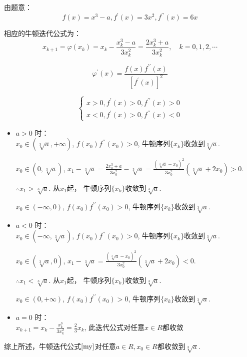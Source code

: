 \documentclass[a4paper]{article}
\begin{document}
由题意：
\begin{equation}
    f(x)=x^{3}-a, f^{\prime}(x)=3 x^{2}, f^{\prime \prime}(x)=6 x \nonumber
\end{equation} \par
相应的牛顿迭代公式为：
\begin{equation}
    x_{k+1}= \varphi(x_k) = x_{k}-\frac{x_{k}^{3}-a}{3 x_{k}^{2}}=\frac{2 x_{k}^{3}+a}{3 x_{k}^{2}}, \quad k=0,1,2, \cdots \label{my}
\end{equation} \par
\begin{equation}
    \varphi^{\prime}(x)=\frac{f(x) f^{\prime \prime}(x)}{\left[f^{\prime}(x)\right]^{2}} \nonumber
\end{equation} \par
\begin{equation}
    \begin{cases}
        x > 0, f^{\prime}(x) > 0, f^{\prime\prime}(x) > 0 \\
        x < 0, f^{\prime}(x) > 0, f^{\prime\prime}(x) < 0 
        \nonumber
    \end{cases}
\end{equation} \par
\begin{itemize}
    \item $a > 0$ 时： \\
    $x_{0}\in (\sqrt[3]{a}, +\infty)$, $f\left(x_{0}\right) f^{\prime \prime}\left(x_{0}\right)>0$, 牛顿序列$\{x_k\}$收敛到$\sqrt[3]{a}$. \par
    $x_{0}\in (0, \sqrt[3]{a})$, $x_{1}-\sqrt[3]{a}=\frac{2 x_{0}^{3}+a}{3 x_{0}^{2}}-\sqrt[3]{a}=\frac{\left(\sqrt[3]{a}-x_{0}\right)^{2}}{3 x_{0}^{2}}\left(\sqrt[3]{a}+2 x_{0}\right)>0$. \par
    $\therefore x_1 > \sqrt[3]{a}$. 从$x_1$起， 牛顿序列$\{x_k\}$收敛到$\sqrt[3]{a}$. \par
    $x_{0}\in (-\infty, 0)$, $f\left(x_{0}\right) f^{\prime \prime}\left(x_{0}\right)>0$, 牛顿序列$\{x_k\}$收敛到$\sqrt[3]{a}$. \par
    \item $a < 0$ 时： \\
    $x_{0}\in (-\infty, \sqrt[3]{a})$, $f\left(x_{0}\right) f^{\prime \prime}\left(x_{0}\right)>0$, 牛顿序列$\{x_k\}$收敛到$\sqrt[3]{a}$. \par
    $x_{0}\in (\sqrt[3]{a}, 0)$, $x_{1}-\sqrt[3]{a}=\frac{\left(\sqrt[3]{a}-x_{0}\right)^{2}}{3 x_{0}^{2}}\left(\sqrt[3]{a}+2 x_{0}\right)<0$. \par
    $\therefore x_1 < \sqrt[3]{a}$. 从$x_1$起， 牛顿序列$\{x_k\}$收敛到$\sqrt[3]{a}$. \par
    $x_{0}\in (0, +\infty)$, $f\left(x_{0}\right) f^{\prime \prime}\left(x_{0}\right)>0$, 牛顿序列$\{x_k\}$收敛到$\sqrt[3]{a}$. \par
    \item $a = 0$ 时： \\
    $x_{k+1}=x_{k}-\frac{x_{k}^{3}}{3 x_{k}^{2}}=\frac{2}{3} x_{k}$, 此迭代公式对任意$x\in R$都收敛
\end{itemize}
综上所述，牛顿迭代公式$\ref{my}$对任意$a \in R, x_0 \in R$都收敛到$\sqrt[3]{a}$.
\end{document}

